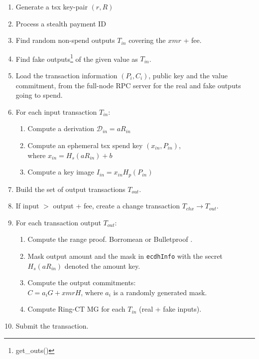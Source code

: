 \documentclass[]{article}
\begin{document}
\begin{enumerate}
	\item Generate a tsx key-pair $(r, R)$
	\item Process a stealth payment ID
	\item Find random non-spend outputs $T_{in}$ covering the $xmr$ + fee.
	\item Find fake outputs\footnote{get\_outs()} of the given value as $T_{in}$.
	\item Load the transaction information $(P_i, C_i)$, public key and the value commitment, from the full-node RPC server for the real and fake outputs going to spend.
	\item For each input transaction $T_{in}$:
	\begin{enumerate}
		\item Compute a derivation $\mathcal{D}_{in} = aR_{in}$
		\item Compute an ephemeral tsx spend key $(x_{in}, P_{in})$, \\where $x_{in} = H_s(aR_{in}) + b$
		\item Compute a key image $I_{in} = x_{in}H_p(P_{in})$
	\end{enumerate}
	\item Build the set of output transactions $T_{out}$.
	\item If input $>$ output + fee, create a change transaction $T_{chx} \rightarrow T_{out}$. 
	\item For each transaction output $T_{out}$:
	\begin{enumerate}
		\item Compute the range proof. Borromean or Bulletproof \cite{monero_1098, borromean, Bnz2017BulletproofsSP}.
		\item Mask output amount and the mask in \verb|ecdhInfo| with the secret $H_s(aR_{in})$ denoted the amount key.
		\item Compute the output commitments:\\ 
		$C = a_iG + xmrH$, where $a_i$ is a randomly generated mask.
		\item Compute Ring-CT MG for each $T_{in}$ (real + fake inputs).
	\end{enumerate}
	\item Submit the transaction.
\end{enumerate}
\end{document}
